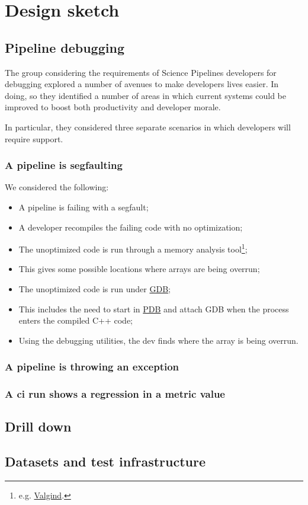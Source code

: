 \section{Design sketch}
\label{sec:design}

\subsection{Pipeline debugging}
\label{sec:design:debug}


The group considering the requirements of Science Pipelines developers for
debugging explored a number of avenues to make developers lives easier. In
doing, so they identified a number of areas in which current systems could be
improved to boost both productivity and developer morale.

In particular, they considered three separate scenarios in which developers
will require support.

\subsubsection{A pipeline is segfaulting}

We considered the following:

\begin{itemize}

\item{A pipeline is failing with a segfault;}
\item{A developer recompiles the failing code with no optimization;}
\item{The unoptimized code is run through a memory analysis tool\footnote{e.g. \href{http://valgrind.org}{Valgind}.};}
\item{This gives some possible locations where arrays are being overrun;}
\item{The unoptimized code is run under \href{https://www.gnu.org/software/gdb/}{GDB};}
\item{This includes the need to start in \href{https://docs.python.org/3/library/pdb.html}{PDB} and attach GDB when the process enters the compiled C++ code;}
\item{Using the debugging utilities, the dev finds where the array is being overrun.}

\end{itemize}


\subsubsection{A pipeline is throwing an exception}

\subsubsection{A \gls{ci} run shows a regression in a \gls{metric value}}



\subsection{Drill down}
\label{sec:design:drill}


\subsection{Datasets and test infrastructure}
\label{sec:design:test}

